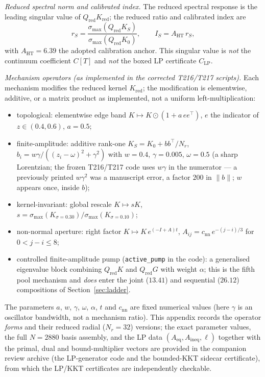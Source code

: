 \documentclass[11pt,a4paper]{article}
\begin{document}
\emph{Reduced spectral norm and calibrated index.} The reduced spectral response is the leading singular value of $Q_{\mathrm{red}}K_{\mathrm{red}}$; the reduced ratio and calibrated index are
\[
r_{S} = \frac{\sigma_{\max}(Q_{\mathrm{red}}K_{S})}{\sigma_{\max}(Q_{\mathrm{red}}K_{0})},
\qquad
I_{S} = A_{\mathrm{HT}}\,r_{S},
\]
with $A_{\mathrm{HT}}=6.39$ the adopted calibration anchor. This singular value is \emph{not} the continuum coefficient $C[T]$ and \emph{not} the boxed LP certificate $C_{\mathrm{LP}}$.

\emph{Mechanism operators (as implemented in the corrected T216/T217 scripts).} Each mechanism modifies the reduced kernel $K_{\mathrm{red}}$; the modification is elementwise, additive, or a matrix product as implemented, not a uniform left-multiplication:
\begin{itemize}
\item topological: elementwise edge band $K\mapsto K\odot(1+a\,ee^{\top})$, $e$ the indicator of $z\in(0.4,0.6)$, $a=0.5$;
\item finite-amplitude: additive rank-one $K_{S}=K_{0}+bb^{\top}/N_{r}$, $b_{i}=w\gamma/((z_{i}-\omega)^{2}+\gamma^{2})$ with $w=0.4$, $\gamma=0.005$, $\omega=0.5$ (a sharp Lorentzian; the frozen T216/T217 code uses $w\gamma$ in the numerator --- a previously printed $w\gamma^{2}$ was a manuscript error, a factor $200$ in $\|b\|$; $w$ appears once, inside $b$);
\item kernel-invariant: global rescale $K\mapsto sK$, $s=\sigma_{\max}(K_{\sigma=0.30})/\sigma_{\max}(K_{\sigma=0.10})$;
\item non-normal aperture: right factor $K\mapsto K\,e^{(-I+A)t}$, $A_{ij}=c_{\mathrm{nn}}\,e^{-(j-i)/3}$ for $0<j-i\le 8$;
\item controlled finite-amplitude pump (\texttt{active\_pump} in the code): a generalised eigenvalue block combining $Q_{\mathrm{red}}K$ and $Q_{\mathrm{red}}G$ with weight $\alpha$; this is the fifth pool mechanism and \emph{does} enter the joint ($13.41$) and sequential ($26.12$) compositions of Section~\ref{sec:ladder}.
\end{itemize}
The parameters $a$, $w$, $\gamma$, $\omega$, $\alpha$, $t$ and $c_{\mathrm{nn}}$ are fixed numerical values (here $\gamma$ is an oscillator bandwidth, not a mechanism ratio). This appendix records the operator \emph{forms} and their reduced radial ($N_{r}=32$) versions; the exact parameter values, the full $N=2880$ basis assembly, and the LP data $(A_{\mathrm{eq}},A_{\mathrm{ineq}},\ell)$ together with the primal, dual and bound-multiplier vectors are provided in the companion review archive (the LP-generator code and the bounded-KKT sidecar certificate), from which the LP/KKT certificates are independently checkable.
\end{document}

